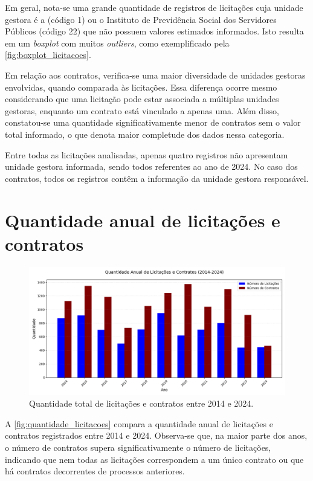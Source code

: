 \documentclass[
	12pt,				%
	oneside,			%
	a4paper,			%
	chapter=TITLE,		%
	section=TITLE,		%
	english,			%
	brazil				%
	]{abntex2}
\begin{document}
Em geral, nota-se uma grande quantidade de registros de licitações cuja unidade gestora é a  (código 1) ou o Instituto de Previdência Social dos Servidores Públicos (código 22) que não possuem valores estimados informados. Isto resulta em um \textit{boxplot} com muitos \textit{outliers}, como exemplificado pela \autoref{fig:boxplot_licitacoes}.

Em relação aos contratos, verifica-se uma maior diversidade de unidades gestoras envolvidas, quando comparada às licitações. Essa diferença ocorre mesmo considerando que uma licitação pode estar associada a múltiplas unidades gestoras, enquanto um contrato está vinculado a apenas uma. Além disso, constatou-se uma quantidade significativamente menor de contratos sem o valor total informado, o que denota maior completude dos dados nessa categoria.

Entre todas as licitações analisadas, apenas quatro registros não apresentam unidade gestora informada, sendo todos referentes ao ano de 2024. No caso dos contratos, todos os registros contêm a informação da unidade gestora responsável.

\section*{Quantidade anual de licitações e contratos}

\begin{figure}[h]
	\begin{center}
		\caption{\label{fig:quantidade_licitacoes}Quantidade total de licitações e contratos entre 2014 e 2024.}
		\includegraphics[scale=0.41]{images/quantidade_anual.png} %
	\end{center}
\end{figure}

A \autoref{fig:quantidade_licitacoes} compara a quantidade anual de licitações e contratos registrados entre 2014 e 2024. Observa-se que, na maior parte dos anos, o número de contratos supera significativamente o número de licitações, indicando que nem todas as licitações correspondem a um único contrato ou que há contratos decorrentes de processos anteriores.
\end{document}
